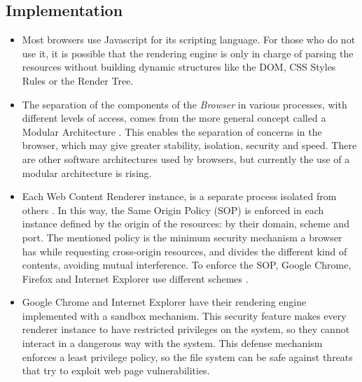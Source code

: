 \documentclass[]{acmlarge}
\begin{document}
    

  \subsection*{Implementation}
    \begin{itemize}\leftskip0.2em
      \item Most browsers use Javascript for its scripting language. For those who do not use it, it is possible that the rendering engine is only in charge of parsing the resources without building dynamic structures like the DOM, CSS Styles Rules or the Render Tree.
      \item The separation of the components of the \textit{Browser} in various processes, with different levels of access, comes from the more general concept called a Modular Architecture \cite{Vrbanec2013}. This enables the separation of concerns in the browser, which may give greater stability, isolation, security and speed. There are other software architectures used by browsers, but currently the use of a modular architecture is rising.
      \item Each Web Content Renderer instance, is a separate process isolated from others \cite{GoogleChromeIsolation,FirefoxThreatModel}. In this way, the Same Origin Policy (SOP) \cite{W3C-SOP} is enforced in each instance defined by the origin of the resources: by their domain, scheme and port. The mentioned policy  is the minimum security mechanism a browser has while requesting cross-origin resources, and divides the different kind of contents, avoiding mutual interference. To enforce the SOP, Google Chrome, Firefox and Internet Explorer use different schemes \cite{Crowley2010,Reis2009,Jackson2008}.
      \item Google Chrome and Internet Explorer have their rendering engine implemented with a sandbox mechanism. This security feature makes every renderer instance to have restricted privileges on the system, so they cannot interact in a dangerous way with the system. This defense mechanism enforces a least privilege policy, so the file system can be safe against threats that try to exploit web page vulnerabilities.
    \end{itemize}
\end{document}
